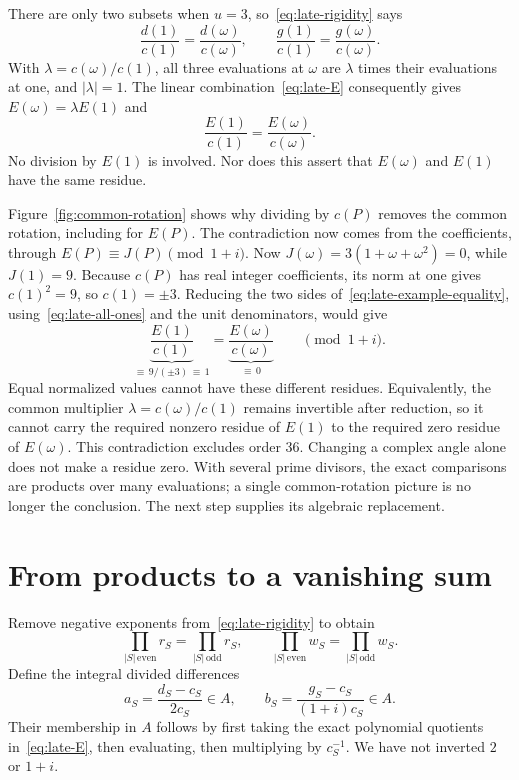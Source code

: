 \documentclass[11pt]{article}
\begin{document}
There are only two subsets when $u=3$, so~\eqref{eq:late-rigidity} says
\[
 \frac{d(1)}{c(1)}=\frac{d(\omega)}{c(\omega)},\qquad
 \frac{g(1)}{c(1)}=\frac{g(\omega)}{c(\omega)}.
\]
With $\lambda=c(\omega)/c(1)$, all three evaluations at $\omega$
are $\lambda$ times their evaluations at one, and $|\lambda|=1$.
The linear combination~\eqref{eq:late-E} consequently gives
$E(\omega)=\lambda E(1)$ and
\begin{equation}
 \frac{E(1)}{c(1)}=\frac{E(\omega)}{c(\omega)}.%
 \label{eq:late-example-equality}
\end{equation}
No division by $E(1)$ is involved. Nor does this assert that
$E(\omega)$ and $E(1)$ have the same residue.

Figure~\ref{fig:common-rotation} shows why dividing by $c(P)$ removes
the common rotation, including for $E(P)$. The contradiction now comes
from the coefficients, through $E(P)\equiv J(P)\pmod{1+i}$.
Now $J(\omega)=3(1+\omega+\omega^{2})=0$, while $J(1)=9$.
Because $c(P)$ has real integer coefficients, its norm at one gives
${c(1)}^{2}=9$, so $c(1)=\pm3$. Reducing the two sides
of~\eqref{eq:late-example-equality}, using~\eqref{eq:late-all-ones}
and the unit denominators, would give
\[
 \underbrace{\frac{E(1)}{c(1)}}_{\displaystyle\equiv\,9/(\pm3)\,\equiv\,1}
 =
 \underbrace{\frac{E(\omega)}{c(\omega)}}_{\displaystyle\equiv\,0}
 \qquad\pmod{1+i}.
\]
Equal normalized values cannot have these different residues. Equivalently,
the common multiplier $\lambda=c(\omega)/c(1)$ remains invertible after
reduction, so it cannot carry the required nonzero residue of $E(1)$ to
the required zero residue of $E(\omega)$. This contradiction excludes
order $36$. Changing a complex angle alone does not make a residue zero.
With several prime divisors, the exact comparisons are
products over many evaluations; a single common-rotation picture is
no longer the conclusion. The next step supplies its algebraic replacement.

\section{From products to a vanishing sum}%
\label{sec:late-sum}

Remove negative exponents from~\eqref{eq:late-rigidity} to obtain
\begin{equation}
 \prod_{|S|\,\mathrm{even}}r_{S}=\prod_{|S|\,\mathrm{odd}}r_{S},
 \qquad
 \prod_{|S|\,\mathrm{even}}w_{S}=\prod_{|S|\,\mathrm{odd}}w_{S}.%
 \label{eq:late-products}
\end{equation}
Define the integral divided differences
\[
 a_{S}=\frac{d_{S}-c_{S}}{2c_{S}}\in A,
 \qquad b_{S}=\frac{g_{S}-c_{S}}{(1+i)c_{S}}\in A.
\]
Their membership in $A$ follows by first taking the exact polynomial
quotients in~\eqref{eq:late-E}, then evaluating, then multiplying by
$c_{S}^{-1}$. We have not inverted $2$ or $1+i$.
\end{document}
